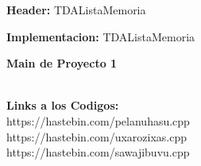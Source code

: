 \documentclass[10pt,a4paper]{article}
\begin{document}
\noindent\textbf{Header:} TDAListaMemoria 

\pagebreak
\noindent\textbf{Implementacion:} TDAListaMemoria

\pagebreak
\noindent\textbf{Main de Proyecto 1}


\\${ }$\\

\textbf{Links a los Codigos:}\\
\noindent
https://hastebin.com/pelanuhasu.cpp \\
https://hastebin.com/uxarozixas.cpp \\
https://hastebin.com/sawajibuvu.cpp
%
%
\end{document}
